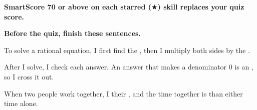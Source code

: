 \textbf{SmartScore 70 or above on each starred ($\bigstar$) skill replaces your quiz score.}


\vspace{6pt}
\textbf{Before the quiz, finish these sentences.}

To solve a rational equation, I first find the \blank[2.4cm], then I multiply both sides by the \blank[3.6cm].

After I solve, I check each answer. An answer that makes a denominator 0 is an \blank[3cm], so I cross it out.

When two people work together, I \blank[2cm] their \blank[1.6cm], and the time together is \blank[2.4cm] than either time alone.


